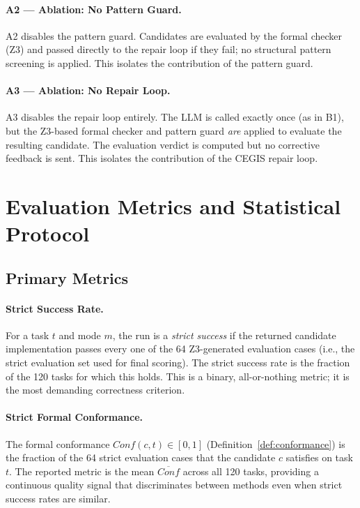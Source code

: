 \paragraph{A2 --- Ablation: No Pattern Guard.}
A2 disables the pattern guard.  Candidates are evaluated by the formal checker
(Z3) and passed directly to the repair loop if they fail; no structural pattern
screening is applied.  This isolates the contribution of the pattern guard.

\paragraph{A3 --- Ablation: No Repair Loop.}
A3 disables the repair loop entirely.  The LLM is called exactly once (as in B1),
but the Z3-based formal checker and pattern guard \emph{are} applied to evaluate the
resulting candidate.  The evaluation verdict is computed but no corrective feedback
is sent.  This isolates the contribution of the CEGIS repair loop.

\section{Evaluation Metrics and Statistical Protocol}
\label{sec:exp:metrics}

\subsection{Primary Metrics}

\paragraph{Strict Success Rate.}
For a task $t$ and mode $m$, the run is a \emph{strict success} if the returned
candidate implementation passes every one of the 64 Z3-generated evaluation cases
(i.e., the strict evaluation set used for final scoring).  The strict success rate
is the fraction of the 120 tasks for which this holds.  This is a binary, all-or-nothing
metric; it is the most demanding correctness criterion.

\paragraph{Strict Formal Conformance.}
The formal conformance $\mathit{Conf}(c, t) \in [0,1]$ (Definition~\ref{def:conformance})
is the fraction of the 64 strict evaluation cases that the candidate $c$ satisfies on
task $t$.  The reported metric is the mean $\overline{\mathit{Conf}}$ across all 120
tasks, providing a continuous quality signal that discriminates between methods even
when strict success rates are similar.

